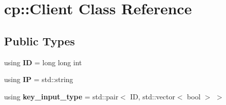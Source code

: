 \hypertarget{classcp_1_1_client}{}\section{cp\+:\+:Client Class Reference}
\label{classcp_1_1_client}
\subsection*{Public Types}
\begin{DoxyCompactItemize}
\item 
\mbox{\label{classcp_1_1_client_a1a4bc6b31cf85823c31298b70146069a}} 
using {\bfseries ID} = long long int
\item 
\mbox{\label{classcp_1_1_client_a7e69dcf4f9e235f0ef6e9b85f1f5e9fc}} 
using {\bfseries IP} = std\+::string
\item 
\mbox{\label{classcp_1_1_client_a2815b2c6eb61baa1b53994ca56aaaf3c}} 
using {\bfseries key\+\_\+input\+\_\+type} = std\+::pair$<$ ID, std\+::vector$<$ bool $>$ $>$
\end{DoxyCompactItemize}
